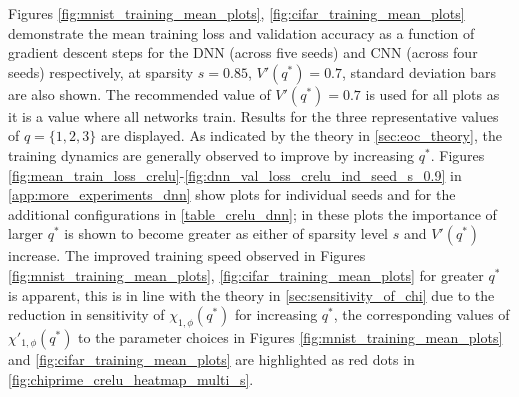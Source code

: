 \documentclass{article}
\theoremstyle{plain}
\theoremstyle{definition}
\theoremstyle{remark}
\begin{document}
Figures \ref{fig:mnist_training_mean_plots}, \ref{fig:cifar_training_mean_plots} demonstrate the mean training loss and validation accuracy as a function of gradient descent steps for the DNN (across five seeds) and CNN (across four seeds) respectively, at sparsity $s=0.85$, $V'(q^*)=0.7$, standard deviation bars are also shown. The recommended value of $V'(q^*)=0.7$ is used for all plots as it is a value where all networks train. Results for the three representative values of $q=\{1,2,3\}$ are displayed. As indicated by the theory in \cref{sec:eoc_theory}, the training dynamics are generally observed to improve by increasing $q^*$. %
Figures \ref{fig:mean_train_loss_crelu}-\ref{fig:dnn_val_loss_crelu_ind_seed_s_0.9} in \cref{app:more_experiments_dnn} show plots for individual seeds and for the additional configurations in \cref{table_crelu_dnn}; in these plots the importance of larger $q^*$ is shown to become greater as either of sparsity level $s$ and $V'(q^*)$ increase. The improved training speed observed in Figures \ref{fig:mnist_training_mean_plots}, \ref{fig:cifar_training_mean_plots} for greater $q^*$ is apparent, this is in line with the theory in \cref{sec:sensitivity_of_chi} due to the reduction in sensitivity of $\chi_{1,\phi}(q^*)$ for increasing $q^*$, the corresponding values of $\chi'_{1, \phi}(q^*)$ to the parameter choices in Figures \ref{fig:mnist_training_mean_plots} and \ref{fig:cifar_training_mean_plots} are highlighted as red dots in \cref{fig:chiprime_crelu_heatmap_multi_s}.

\end{document}
